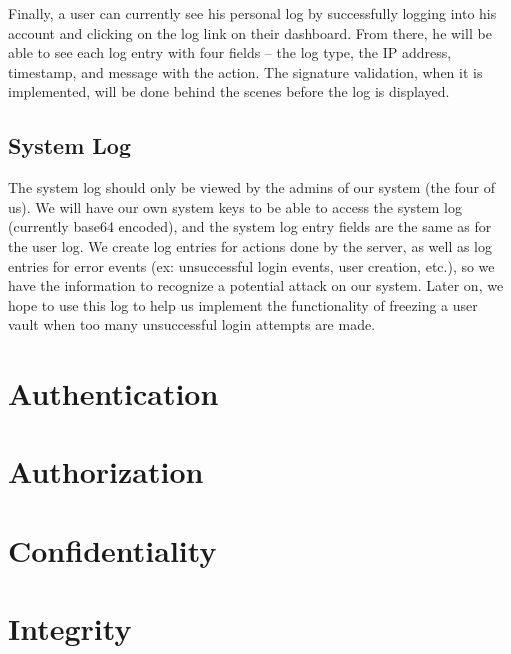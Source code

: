 \documentclass{article}
\begin{document}
\par Finally, a user can currently see his personal log by successfully logging into his account and clicking on the log link on their dashboard. From there, he will be able to see each log entry with four fields – the log type, the IP address, timestamp, and message with the action. The signature validation, when it is implemented, will be done behind the scenes before the log is displayed.

\subsection{System Log}
The system log should only be viewed by the admins of our system (the four of us). We will have our own system keys to be able to access the system log (currently base64 encoded), and the system log entry fields are the same as for the user log. We create log entries for actions done by the server, as well as log entries for error events (ex: unsuccessful login events, user creation, etc.), so we have the information to recognize a potential attack on our system. Later on, we hope to use this log to help us implement the functionality of freezing a user vault when too many unsuccessful login attempts are made.

\section{Authentication}
\section{Authorization}
\section{Confidentiality}
\section{Integrity}
\end{document}
